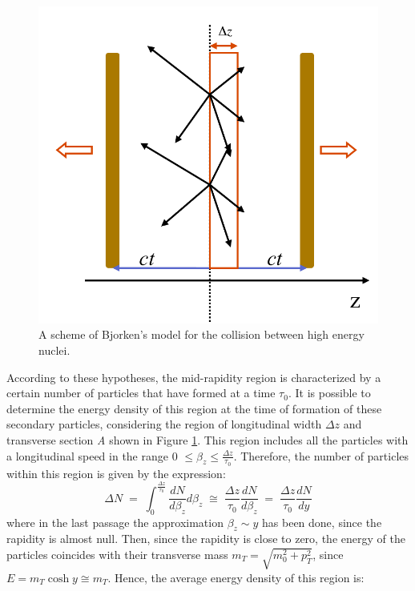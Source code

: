 \begin{figure}
  \centering
  \includegraphics[scale=0.3]{figures/bjorken.png}
  \caption{A scheme of Bjorken's model for the collision between high energy nuclei.}
  \label{fig:bjor}
\end{figure}
%
According to these hypotheses, the mid-rapidity region is characterized by a certain number of particles that have formed at a time $\tau_{0}$. It is possible to determine the energy density of this region at the time of formation of these secondary particles, considering the region of longitudinal width $\Delta z$ and transverse section \textit{A} shown in Figure \ref{fig:bjor}. This region includes all the particles with a longitudinal speed in the range 0 $\leq \beta_{z} \leq \frac{\Delta z}{\tau_{0}}$. Therefore, the number of particles within this region is given by the expression:
\begin{equation}
 \Delta N \;=\; \int_{0}^{\frac{\Delta z}{\tau_{0}}} \frac{dN}{d\beta_{z}}d\beta_{z}\;\cong\;\frac{\Delta z}{\tau_{0}}\frac{dN}{d\beta_{z}}\;=\;\frac{\Delta z}{\tau_{0}}\frac{dN}{dy}
\end{equation}
where in the last passage the approximation $\beta_{z}\sim y$ has been done, since the rapidity is almost null. Then, since the rapidity is close to zero, the energy of the particles coincides with their transverse mass $m_{T} = \sqrt{m_{0}^{2} + p_{T}^{2}}$, since $E = m_{T} \cosh y \cong  m_{T}$. Hence, the average energy density of this region is:
